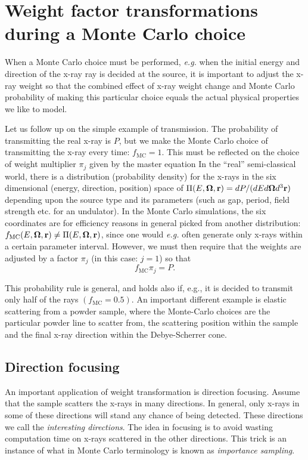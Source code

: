\section{Weight factor transformations during a Monte Carlo
 choice}
When a Monte Carlo choice must be performed, {\em e.g.} when the
initial energy and direction of the x-ray ray is decided at the source,
it is important to adjust the x-ray weight so that the combined
effect of x-ray weight change and Monte Carlo probability
of making this particular choice
equals the actual physical properties we like to model.

Let us follow up on the simple example of transmission.
The probability of transmitting the real x-ray is $P$, but we make
the Monte Carlo choice of transmitting the x-ray every time:
$f_\mathrm{MC}=1$. This must be reflected on the choice of weight multiplier
$\pi_j$ given by the master equation
In the ``real'' semi-classical world, there is a distribution
(probability density) for the x-rays in the six dimensional
(energy, direction, position) space of
$\Pi(E,\mbox{\boldmath $\Omega$},\mathbf{r}) = dP/(dE d\mbox{\boldmath $\Omega$} d^3\mathbf{r})$ depending upon
the source type and its parameters (such as gap, period, field strength etc. for an undulator).
In the Monte Carlo simulations, the six coordinates are for efficiency reasons
in general picked from another distribution:
$f_\mathrm{MC}(E,\mbox{\boldmath $\Omega$},\mathbf{r}) \neq \Pi(E, \mbox{\boldmath $\Omega$},\mathbf{r})$,
since one would {\em e.g.} often generate
only x-rays within a certain parameter interval.
However, we must then require that the weights are adjusted
by a factor $\pi_j$ (in this case: $j=1$) so that
\begin{equation} \label{e:probrule}
f_\mathrm{MC} \pi_j = P .
\end{equation}

This probability rule is general, and holds also if, e.g., it is decided to
transmit only half of the rays $(f_\mathrm{MC}=0.5)$.
An important different example
is elastic scattering from a powder sample,
where the Monte-Carlo choices are the particular powder line to scatter from,
the scattering position within the sample and the final x-ray direction
within the Debye-Scherrer cone.

\subsection{Direction focusing}
\label{s:focus}
An important application of weight transformation is direction focusing.
Assume that the sample scatters the x-rays in many directions.
In general, only x-rays in some of these directions will
stand any chance of being detected. These directions we call
the {\em interesting directions}.
The idea in focusing is to avoid wasting computation time on
x-rays scattered in the other directions.
This trick is an instance of what in Monte Carlo terminology
is known as {\em importance sampling}. %

